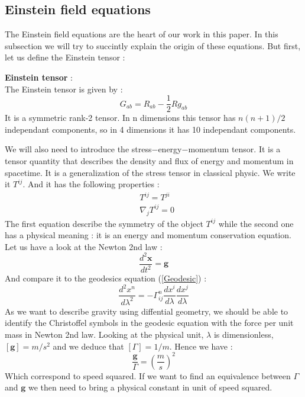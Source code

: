 \documentclass[a4paper,12pt]{article}
\theoremstyle{definition}
\begin{document}
\subsection{Einstein field equations}
The Einstein field equations are the heart of our work in this paper.
In this subsection we will try to succintly explain the origin of these equations.
But first, let us define the Einstein tensor : 
\begin{definition}
	\textbf{Einstein tensor} :\\
	The Einstein tensor is given by :
	\begin{equation}
		G_{ab}=R_{ab}-\frac{1}{2}Rg_{ab}
	\end{equation}
	It is a symmetric rank-2 tensor. In n dimensions this tensor has $n(n+1)/2$ independant components, so in 4 dimensions it has 10 independant components.
\end{definition}
We will also need to introduce the stress$-$energy$-$momentum tensor.
It is a tensor quantity that describes the density and flux of energy and momentum in spacetime.
It is a generalization of the stress tensor in classical physic.
We write it $T^{ij}$.
And it has the following properties :
\begin{align}
	&T^{ij}=T^{ji}\\
	&\nabla_j T^{ij}=0\label{conserv}
\end{align}
The first equation describe the symmetry of the object $T^{ij}$ while the second one has a physical meaning : it is an energy and momentum conservation equation.\\
Let us have a look at the Newton 2nd law :
\begin{equation}
	\frac{d^2\boldsymbol{x}}{dt^2}=\boldsymbol{g}
\end{equation}
And compare it to the geodesics equation (\ref{Geodesic}) :
\begin{equation}
	\frac{d^2x^n}{d\lambda^2}=-\Gamma^n_{ij}\frac{dx^i}{d\lambda}\frac{dx^j}{d\lambda}
\end{equation}
As we want to describe gravity using diffential geometry, we should be able to identify the Christoffel symbols in the geodesic equation with the force per unit mass in Newton 2nd law.
Looking at the physical unit, $\lambda$ is dimensionless, $[\boldsymbol{g}]=m/s^2$ and we deduce that $[\Gamma]=1/m$.
Hence we have :
\begin{equation}
	\frac{\boldsymbol{g}}{\Gamma}=(\frac{m}{s})^2
\end{equation}
Which correspond to speed squared.
If we want to find an equivalence between $\Gamma$ and $\boldsymbol{g}$ we then need to bring a physical constant in unit of speed squared.
\end{document}
